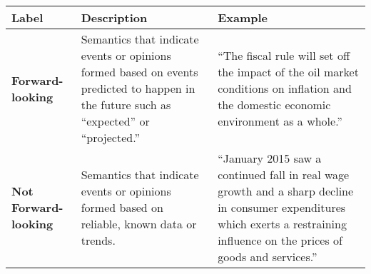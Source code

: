 \begin{table*}
    \caption{}
    \vspace{1em}
    \begin{tabular}{p{}p{}p{}}
    \toprule
    \textbf{Label} & \textbf{Description} & \textbf{Example}\\
    \midrule
    \textbf{Forward-looking} & Semantics that indicate events or opinions formed based on events predicted to happen in the future such as ``expected'' or ``projected.'' & “The fiscal rule will set off the impact of the oil market conditions on inflation and the domestic economic environment as a whole.” \\
    \midrule
    \textbf{Not Forward-looking} & Semantics that indicate events or opinions formed based on reliable, known data or trends. & “January 2015 saw a continued fall in real wage growth and a sharp decline in consumer expenditures which exerts a restraining influence on the prices of goods and services.” \\
    \bottomrule
    \end{tabular}
    \label{tb:cbr_forward_looking_guide}
    \end{table*}